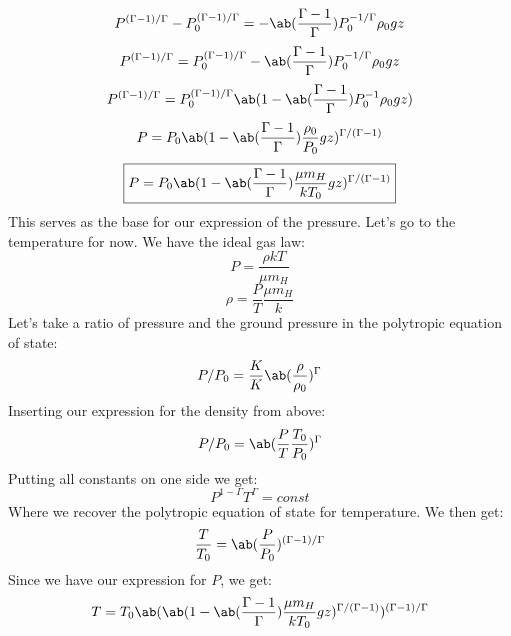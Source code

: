 \begin{equation}
    P^{(\Gamma - 1)/\Gamma} - P_0^{(\Gamma - 1)/\Gamma} = -\ab(\frac{\Gamma-1}{\Gamma})P_0^{-1/\Gamma}\rho_0g z
\end{equation}
\begin{equation}
    P^{(\Gamma - 1)/\Gamma} =P_0^{(\Gamma - 1)/\Gamma} -\ab(\frac{\Gamma-1}{\Gamma})P_0^{-1/\Gamma}\rho_0g z
\end{equation}
\begin{equation}
    P^{(\Gamma - 1)/\Gamma} = P_0^{(\Gamma - 1)/\Gamma}\ab(1-\ab(\frac{\Gamma-1}{\Gamma})P_0^{-1}\rho_0g z)
\end{equation}
\begin{equation}
    P = P_0\ab(1-\ab(\frac{\Gamma-1}{\Gamma})\frac{\rho_0}{P_0}g z)^{\Gamma/(\Gamma-1)}
\end{equation}
\begin{equation}
    \boxed{P = P_0\ab(1-\ab(\frac{\Gamma-1}{\Gamma})\frac{\mu m_H}{kT_0}g z)^{\Gamma/(\Gamma-1)}}
\end{equation}
This serves as the base for our expression of the pressure. Let's go to the temperature for now. We have the ideal gas law:
\begin{equation}
    P = \frac{\rho k T}{\mu m_H}
\end{equation}
\begin{equation}
    \rho = \frac{P}{T}\frac{\mu m_H}{k}
\end{equation}
Let's take a ratio of pressure and the ground pressure in the polytropic equation of state:
\begin{equation}
    P/P_0 = \frac{K}{K}\ab(\frac{\rho}{\rho_0})^{\Gamma}
\end{equation}
Inserting our expression for the density from above:
\begin{equation}
    P/P_0 = \ab(\frac{P}{T}\frac{T_0}{P_0})^\Gamma
\end{equation}
Putting all constants on one side we get:
\begin{equation}
    P^{1-\Gamma}T^{\Gamma} = const
\end{equation}
Where we recover the polytropic equation of state for temperature. We then get:
\begin{equation}
    \frac{T}{T_0} = \ab(\frac{P}{P_0})^{(\Gamma - 1)/\Gamma}
\end{equation}
Since we have our expression for $P$, we get:
\begin{equation}
    T = T_0\ab(\ab(1-\ab(\frac{\Gamma-1}{\Gamma})\frac{\mu m_H}{kT_0}g z)^{\Gamma/(\Gamma-1)})^{(\Gamma - 1)/\Gamma}
\end{equation}
